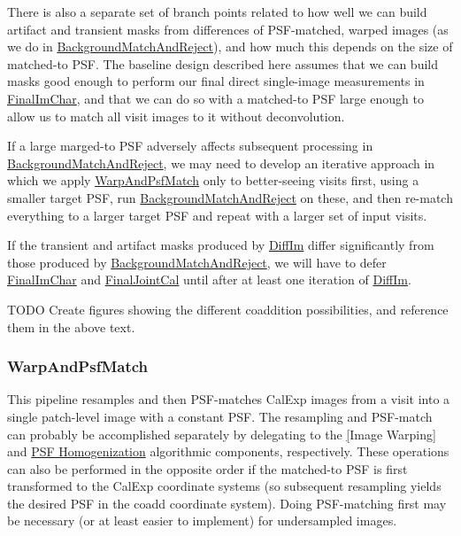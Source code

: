 There is also a separate set of branch points related to how well we can build artifact and transient masks from differences of PSF-matched, warped images (as we do in \hyperref[sec:drpBackgroundMatchAndReject]{BackgroundMatchAndReject}), and how much this depends on the size of matched-to PSF.  The baseline design described here assumes that we can build masks good enough to perform our final direct single-image measurements in \hyperref[sec:drpFinalImChar]{FinalImChar}, and that we can do so with a matched-to PSF large enough to allow us to match all visit images to it without deconvolution.

If a large marged-to PSF adversely affects subsequent processing in \hyperref[sec:drpBackgroundMatchAndReject]{BackgroundMatchAndReject}, we may need to develop an iterative approach in which we apply \hyperref[sec:drpWarpAndPsfMatch]{WarpAndPsfMatch} only to better-seeing visits first, using a smaller target PSF, run \hyperref[sec:drpBackgroundMatchAndReject]{BackgroundMatchAndReject} on these, and then re-match everything to a larger target PSF and repeat with a larger set of input visits.

If the transient and artifact masks produced by \hyperref[sec:drpDiffIm]{DiffIm} differ significantly from those produced by \hyperref[sec:drpBackgroundMatchAndReject]{BackgroundMatchAndReject}, we will have to defer \hyperref[sec:drpFinalImChar]{FinalImChar} and \hyperref[sec:drpFinalJointCal]{FinalJointCal} until after at least one iteration of \hyperref[sec:drpDiffIm]{DiffIm}.

\begin{note}{TODO}
Create figures showing the different coaddition possibilities, and reference them in the above text.
\end{note}

\subsubsection{WarpAndPsfMatch}
\label{sec:drpWarpAndPsfMatch}

This pipeline resamples and then PSF-matches CalExp images from a visit into a single patch-level image with a constant PSF.  The resampling and PSF-match can probably be accomplished separately by delegating to the \hyperref[sec:acWarping][Image Warping] and \hyperref[sec:acPSFHomogenization]{PSF Homogenization} algorithmic components, respectively.  These operations can also be performed in the opposite order if the matched-to PSF is first transformed to the CalExp coordinate systems (so subsequent resampling yields the desired PSF in the coadd coordinate system).  Doing PSF-matching first may be necessary (or at least easier to implement) for undersampled images.

